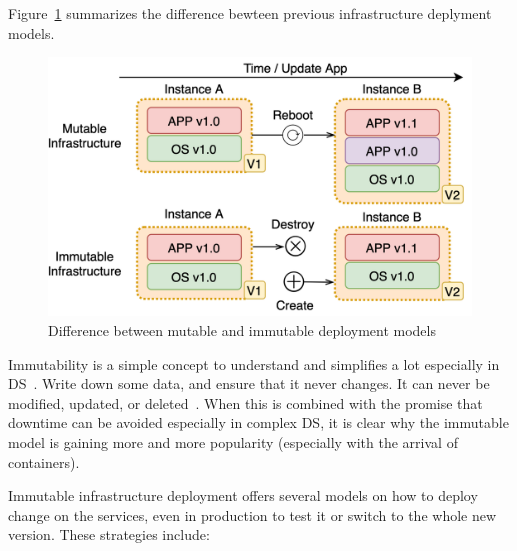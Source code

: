 \noindent
Figure~\ref{fig:fig12} summarizes the difference bewteen previous infrastructure deplyment models.

\begin{figure}[H]
	\begin{center}
		\includegraphics[scale=0.9]{images/Figure12.png}
	\end{center}
	\vspace{-0.6cm}
	\caption{Difference between mutable and immutable deployment models}
	\label{fig:fig12}
\end{figure}

\noindent
Immutability is a simple concept to understand and simplifies a lot especially in DS~\cite{Helland16}. Write down some data, and ensure that it never changes. It can never be modified, updated, or deleted~\cite{perry2020art}. When this is combined with the promise that downtime can be avoided especially in complex DS, it is clear why the immutable model is gaining more and more popularity (especially with the arrival of containers). 

Immutable infrastructure deployment offers several models on how to deploy change on the services, even in production to test it or switch to the whole new version. These strategies include:

